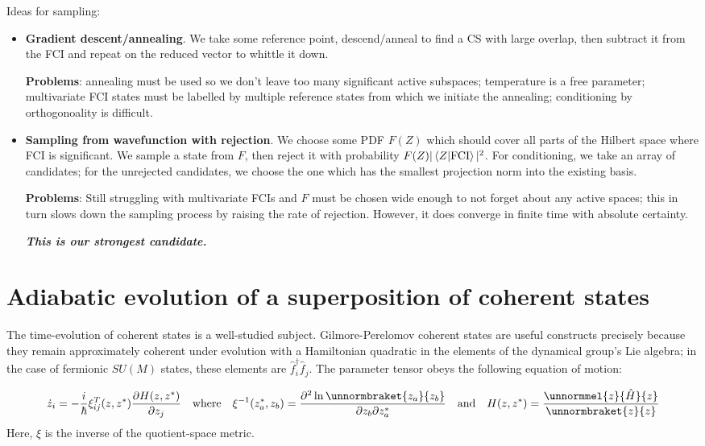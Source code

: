 \documentclass[12pt]{article}
\newcommand{\hc}{^\dagger}
\begin{document}
	Ideas for sampling:
	\begin{itemize}
	\item \textbf{Gradient descent/annealing}. We take some reference point, descend/anneal to find a CS with large overlap, then subtract it from the FCI and repeat on the reduced vector to whittle it down.
	
	 \textbf{Problems}: annealing must be used so we don't leave too many significant active subspaces; temperature is a free parameter; multivariate FCI states must be labelled by multiple reference states from which we initiate the annealing; conditioning by orthogonoality is difficult.
	 \item \textbf{Sampling from wavefunction with rejection}. We choose some PDF $F(Z)$ which should cover all parts of the Hilbert space where FCI is significant. We sample a state from $F$, then reject it with probability $F(Z)|\braket{Z}{\rm FCI}|^2$. For conditioning, we take an array of candidates; for the unrejected candidates, we choose the one which has the smallest projection norm into the existing basis.
	 
	 \textbf{Problems}: Still struggling with multivariate FCIs and $F$ must be chosen wide enough to not forget about any active spaces; this in turn slows down the sampling process by raising the rate of rejection. However, it does converge in finite time with absolute certainty.
	 
	 \textbf{\textit{This is our strongest candidate.}}
	\end{itemize}
	
	
	
	
	
	
	
	\section{Adiabatic evolution of a superposition of coherent states}
	
	The time-evolution of coherent states is a well-studied subject. Gilmore-Perelomov coherent states are useful constructs precisely because they remain approximately coherent under evolution with a Hamiltonian quadratic in the elements of the dynamical group's Lie algebra; in the case of fermionic $SU(M)$ states, these elements are $\hat{f}_i\hc \hat{f}_j$. The parameter tensor obeys the following equation of motion:
	
	\begin{equation}\label{eq: cs evolution}
	\dot{z}_i = -\frac{i}{\hbar} \xi^T_{ij}(z, z^*) \pdv{H(z, z^*)}{z_j}\qq{where} \xi^{-1}(z_a^*, z_b) = \pdv[2]{\ln{\unnormbraket{z_a}{z_b}}}{z_b}{z^*_a}\qq{and}H(z, z^*) = \frac{\unnormmel{z}{\hat{H}}{z}}{\unnormbraket{z}{z}}
	\end{equation}
	Here, $\xi$ is the inverse of the quotient-space metric.
	
\end{document}
